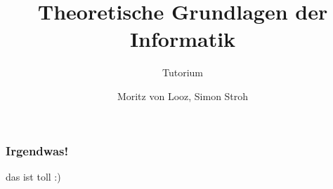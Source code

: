 \documentclass{beamer}
\title{Theoretische Grundlagen der Informatik}
\subtitle{Tutorium}
\author{Moritz von Looz, Simon Stroh}
\institute[ITI]{Intitute für Theoretische Informatik}
\begin{document}
\begin{frame}
  \maketitle
\end{frame}

\begin{frame}
 \frametitle{Irgendwas!}
 das ist toll :)
\end{frame}
\end{document}
